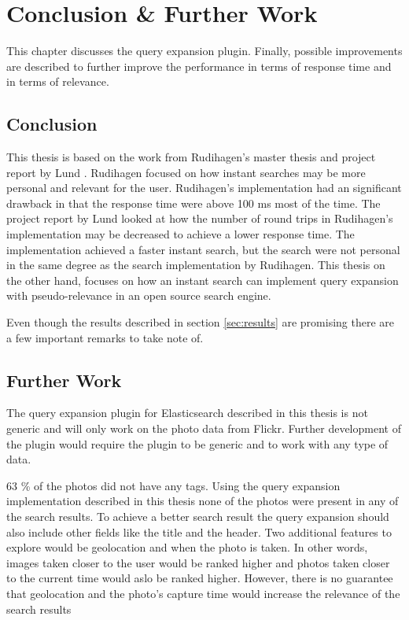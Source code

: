 \chapter{Conclusion \& Further Work}
\label{ch:conclusion}
This chapter discusses the query expansion plugin.
Finally,
possible improvements are described to further improve the performance in terms of response time and in terms of relevance.

\section{Conclusion}
This thesis is based on the work from Rudihagen's master thesis \cite{master-thesis} and project report by Lund \cite{project-report}.
Rudihagen focused on how instant searches may be more personal and relevant for the user.
Rudihagen's implementation had an significant drawback in that the response time were above 100 ms most of the time.
The project report by Lund looked at how the number of round trips in Rudihagen's implementation may be decreased to achieve a lower response time.
The implementation achieved a faster instant search,
but the search were not personal in the same degree as the search implementation by Rudihagen.
This thesis on the other hand,
focuses on how an instant search can implement query expansion with pseudo-relevance in an open source search engine.

Even though the results described in section \ref{sec:results} are promising there are a few important remarks to take note of.



\section{Further Work}
The query expansion plugin for Elasticsearch described in this thesis is not generic and will only work on the photo data from Flickr.
Further development of the plugin would require the plugin to be generic and to work with any type of data.

63 \% of the photos did not have any tags.
Using the query expansion implementation described in this thesis none of the photos were present in any of the search results.
To achieve a better search result the query expansion should also include other fields like the title and the header.
Two additional features to explore would be geolocation and when the photo is taken.
In other words,
images taken closer to the user would be ranked higher and photos taken closer to the current time would aslo be ranked higher.
However, there is no guarantee that geolocation and the photo's capture time would increase the relevance of the search results





